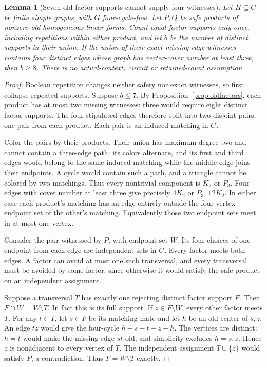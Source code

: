 \documentclass[11pt]{article}
\newtheorem{lemma}[theorem]{Lemma}
\theoremstyle{definition}
\theoremstyle{remark}
\begin{document}
\begin{lemma}[Seven old factor supports cannot supply four witnesses]
\label{lem:sevenoldfactors}
Let $H\subseteq G$ be finite simple graphs, with $G$ four-cycle-free.
Let $P,Q$ be safe products of nonzero old homogeneous linear forms.
Count equal factor supports only once, including repetitions within either
product, and let $b$ be the number of distinct supports in their union.
If the union of their exact missing-edge witnesses contains four distinct
edges whose graph has vertex-cover number at least three, then $b\ge8$.
There is no actual-context, circuit or retained-count assumption.
\end{lemma}
\begin{proof}
Boolean repetition changes neither safety nor exact witnesses, so first
collapse repeated supports. Suppose $b\le7$. By
Proposition~\ref{prop:oldfactors}, each product has at most two missing
witnesses: three would require eight distinct factor supports.
The four stipulated edges therefore split into two disjoint pairs,
one pair from each product. Each pair is an induced matching in $G$.

Color the pairs by their products. Their union has maximum degree two
and cannot contain a three-edge path: its colors alternate, and its first
and third edges would belong to the same induced matching while the middle
edge joins their endpoints. A cycle would contain such a path, and a
triangle cannot be colored by two matchings. Thus every nontrivial
component is $K_2$ or $P_3$. Four edges with cover number at least three
give precisely $4K_2$ or $P_3\sqcup2K_2$.
In either case each product's matching has an edge entirely outside the
four-vertex endpoint set of the other's matching. Equivalently those two
endpoint sets meet in at most one vertex.

Consider the pair witnessed by $P$, with endpoint set $W$.
Its four choices of one endpoint from each edge are independent sets in
$G$. Every factor meets both edges. A factor can avoid at most one such
transversal, and every transversal must be avoided by some factor, since
otherwise it would satisfy the safe product on an independent assignment.

Suppose a transversal $T$ has exactly one rejecting distinct factor
support $F$. Then $F\cap W=W\setminus T$. In fact this is its full support.
If $z\in F\setminus W$, every other factor meets $T$. For any $t\in T$,
let $s\in F$ be its matching mate and let $h$ be an old center of $s,z$.
An edge $tz$ would give the four-cycle $h-s-t-z-h$.
The vertices are distinct: $h=t$ would make the missing edge $st$ old,
and simplicity excludes $h=s,z$. Hence $z$ is nonadjacent to every
vertex of $T$. The independent assignment $T\cup\{z\}$ would satisfy
$P$, a contradiction. Thus $F=W\setminus T$ exactly.


\end{proof}
\end{document}
